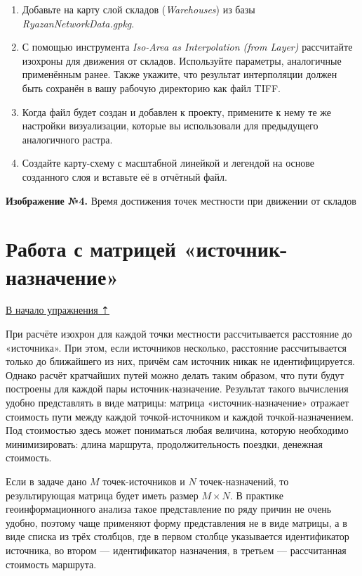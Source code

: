 \documentclass[
  12pt,
]{book}
\begin{document}
\begin{enumerate}
\def\labelenumi{\arabic{enumi}.}
\setcounter{enumi}{8}
\item
  Добавьте на карту слой складов (\emph{Warehouses}) из базы \emph{RyazanNetworkData.gpkg}.
\item
  С помощью инструмента \emph{Iso-Area as Interpolation (from Layer)} рассчитайте изохроны для движения от складов. Используйте параметры, аналогичные применённым ранее. Также укажите, что результат интерполяции должен быть сохранён в вашу рабочую директорию как файл TIFF.
\item
  Когда файл будет создан и добавлен к проекту, примените к нему те же настройки визуализации, которые вы использовали для предыдущего аналогичного растра.
\item
  Создайте карту-схему с масштабной линейкой и легендой на основе созданного слоя и вставьте её в отчётный файл.
\end{enumerate}

\textbf{Изображение №4.} Время достижения точек местности при движении от складов

\hypertarget{networks-matrix}{%
\section{Работа с матрицей «источник-назначение»}\label{networks-matrix}}

\protect\hyperlink{networks}{В начало упражнения ⇡}

При расчёте изохрон для каждой точки местности рассчитывается расстояние до «источника». При этом, если источников несколько, расстояние рассчитывается только до ближайшего из них, причём сам источник никак не идентифицируется. Однако расчёт кратчайших путей можно делать таким образом, что пути будут построены для каждой пары источник-назначение. Результат такого вычисления удобно представлять в виде матрицы: матрица «источник-назначение» отражает стоимость пути между каждой точкой-источником и каждой точкой-назначением. Под стоимостью здесь может пониматься любая величина, которую необходимо минимизировать: длина маршрута, продолжительность поездки, денежная стоимость.

Если в задаче дано \(M\) точек-источников и \(N\) точек-назначений, то результирующая матрица будет иметь размер \(M \times N\). В практике геоинформационного анализа такое представление по ряду причин не очень удобно, поэтому чаще применяют форму представления не в виде матрицы, а в виде списка из трёх столбцов, где в первом столбце указывается идентификатор источника, во втором --- идентификатор назначения, в третьем --- рассчитанная стоимость маршрута.
\end{document}
